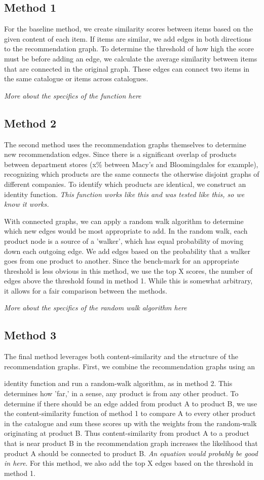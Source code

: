 \documentclass[10pt]{article}
\begin{document}
\subsection*{Method 1}
For the baseline method, we create similarity scores between items based on the
given content of each item. If items are similar, we add edges in
both directions to the recommendation graph. To determine the threshold of how
high the score must be before adding an edge, we calculate the average
similarity between items that are connected in the original graph.  These edges
can connect two items in the same catalogue or items across catalogues.

\emph{More about the specifics of the function here}

\subsection*{Method 2}
The second method uses the recommendation graphs themselves to determine new
recommendation edges. Since there is a significant overlap of products between
department stores (x\% between Macy's and Bloomingdales for example),
recognizing which products are the same connects the otherwise disjoint graphs
of different companies. To identify which products are identical, we construct
an identity function. \emph{This function works like this and was tested like
this, so we know it works.}

With connected graphs, we can apply a random walk algorithm to determine which
new edges would be most appropriate to add. In the random walk, each product
node is a source of a 'walker', which has equal probability of moving down each
outgoing edge. We add edges based on the probability that a walker goes from
one product to another. Since the bench-mark for an appropriate threshold is
less obvious in this method, we use the top X scores, the number of edges above
the threshold found in method 1. While this is somewhat arbitrary, it allows
for a fair comparison between the methods.

\emph{More about the specifics of the random walk algorithm here}

\subsection*{Method 3}
The final method leverages both content-similarity and the structure of the
recommendation graphs. First, we combine the recommendation graphs using an

identity function and run a random-walk algorithm, as in method 2. This
determines how 'far,' in a sense, any product is from any other product. To
determine if there should be an edge added from product A to product B, we use
the content-similarity function of method 1 to compare A to every other product
in the catalogue and sum these scores up with the weights from the random-walk
originating at product B. Thus content-similarity from product A to a product
that is near product B in the recommendation graph increases the likelihood
that product A should be connected to product B. \emph{An equation would
probably be good in here}. For this method, we also add the top X edges based
on the threshold in method 1.
\end{document}

